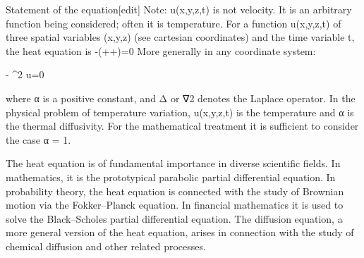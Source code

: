 Statement of the equation[edit]
Note: u(x,y,z,t) is not velocity. It is an arbitrary function being considered; often it is temperature.
For a function u(x,y,z,t) of three spatial variables (x,y,z) (see cartesian coordinates) and the time variable t, the heat equation is
 -\alpha\left(++\right)=0
More generally in any coordinate system:


 - \alpha \nabla^2 u=0 
 

where α is a positive constant, and Δ or ∇2 denotes the Laplace operator. In the physical problem of temperature variation, u(x,y,z,t) is the temperature and α is the thermal diffusivity. For the mathematical treatment it is sufficient to consider the case α = 1.

The heat equation is of fundamental importance in diverse scientific fields. In mathematics, it is the prototypical parabolic partial differential equation. In probability theory, the heat equation is connected with the study of Brownian motion via the Fokker–Planck equation. In financial mathematics it is used to solve the Black–Scholes partial differential equation. The diffusion equation, a more general version of the heat equation, arises in connection with the study of chemical diffusion and other related processes.

